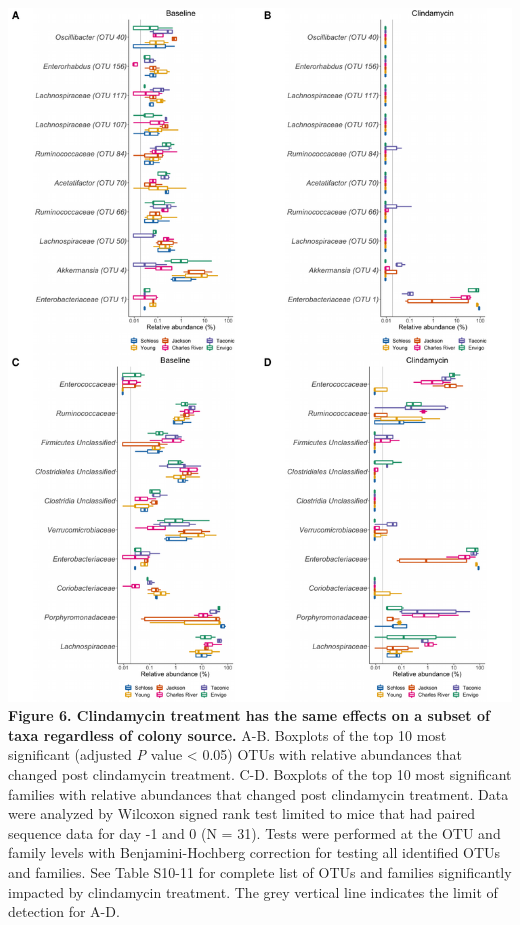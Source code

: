 \documentclass[11pt,]{article}
\begin{document}
\includegraphics{figure_6.pdf} \textbf{Figure 6. Clindamycin treatment
has the same effects on a subset of taxa regardless of colony source.}
A-B. Boxplots of the top 10 most significant (adjusted \emph{P} value
\textless{} 0.05) OTUs with relative abundances that changed post
clindamycin treatment. C-D. Boxplots of the top 10 most significant
families with relative abundances that changed post clindamycin
treatment. Data were analyzed by Wilcoxon signed rank test limited to
mice that had paired sequence data for day -1 and 0 (N = 31). Tests were
performed at the OTU and family levels with Benjamini-Hochberg
correction for testing all identified OTUs and families. See Table
S10-11 for complete list of OTUs and families significantly impacted by
clindamycin treatment. The grey vertical line indicates the limit of
detection for A-D.

\newpage
\end{document}

